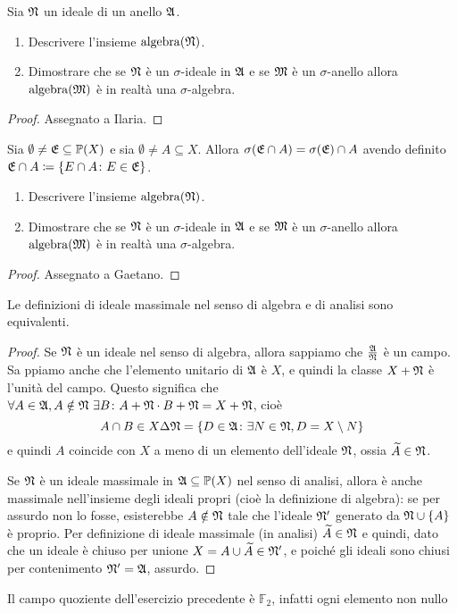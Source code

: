 \documentclass[../EserciziIstituzioniAnalisi.tex]{subfiles}
\begin{document}
\begin{exercise}[13/10/2016]
Sia $\mathfrak N$ un ideale di un anello $\mathfrak A$.
\begin{enumerate}
\item Descrivere l'insieme $\operatorname{algebra}(\mathfrak N)$.
\item Dimostrare che se $\mathfrak N$ è un $\sigma$-ideale in $\mathfrak A$ e se $\mathfrak M$ è un $\sigma$-anello allora $\operatorname{algebra}(\mathfrak M)$ è in realtà una $\sigma$-algebra.
\end{enumerate}
\end{exercise}
\begin{proof}
  Assegnato a Ilaria.
\end{proof}

\begin{exercise}[2016-10-13]
Sia $\emptyset \neq \mathfrak E \subseteq \mathbb P(X)$ e sia $\emptyset \neq A \subseteq X$.
Allora $\sigma(\mathfrak E \cap A) = \sigma(\mathfrak E) \cap A$ avendo definito $\mathfrak E \cap A \coloneqq \left\lbrace E \cap A \colon E \in \mathfrak E\right\rbrace$.
\begin{enumerate}
\item Descrivere l'insieme $\operatorname{algebra}(\mathfrak N)$.
\item Dimostrare che se $\mathfrak N$ è un $\sigma$-ideale in $\mathfrak A$ e se $\mathfrak M$ è un $\sigma$-anello allora $\operatorname{algebra}(\mathfrak M)$ è in realtà una $\sigma$-algebra.
\end{enumerate}
\end{exercise}
\begin{proof}
Assegnato a Gaetano.
\end{proof}

\begin{exercise}[13/10/2016]
  Le definizioni di ideale massimale nel senso di algebra e di analisi sono equivalenti.
\end{exercise}
\begin{proof}
  Se $\mathfrak N$ è un ideale nel senso di algebra, allora sappiamo che $\frac{\mathfrak A}{\mathfrak N}$ è un campo. Sa ppiamo anche che l'elemento unitario di $\mathfrak A$ è $X$, e quindi la classe $X+\mathfrak N$ è l'unità del campo.  
  Questo significa che $\forall A \in \mathfrak A, A \notin \mathfrak N\ \exists B \colon A+\mathfrak N \cdot B+\mathfrak N = X+\mathfrak N$, cioè
  \begin{equation*}
    A \cap B \in X \Delta \mathfrak N=\{D\in \mathfrak A \colon \exists N\in \mathfrak N, D=X\setminus N \}
  \end{equation*}
  e quindi $A$ coincide con $X$ a meno di un elemento dell'ideale $\mathfrak N$, ossia $\widetilde{A}\in \mathfrak N$.

  Se $\mathfrak N$ è un ideale massimale in $\mathfrak A\subseteq \mathbb P(X)$ nel senso di analisi, allora è anche massimale nell'insieme degli ideali propri (cioè la definizione di algebra): se per assurdo non lo fosse, esisterebbe $A\notin \mathfrak N$ tale che l'ideale $\mathfrak N'$ generato da $\mathfrak N\cup \{A\}$ è proprio. Per definizione di ideale massimale (in analisi) $\widetilde{A}\in \mathfrak N$ e quindi, dato che un ideale è chiuso per unione $X=A\cup\widetilde{A}\in \mathfrak N'$, e poiché gli ideali sono chiusi per contenimento $\mathfrak N'=\mathfrak A$, assurdo.
\end{proof}
\begin{remark}
  Il campo quoziente dell'esercizio precedente è $\mathbb{F}_2$, infatti ogni elemento non nullo 
\end{remark}
\end{document}
